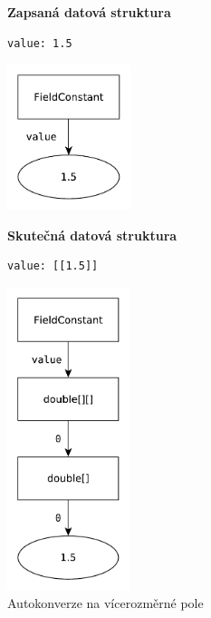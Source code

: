 \documentclass[FM,bw,DP]{tulthesis}
\begin{document}
\begin{figure}[ht]
\begin{minipage}[t]{0.45\linewidth}
\vspace{0pt}
\textbf{Zapsaná datová struktura}\\
\vspace{-5pt}
\begin{lstlisting}
value: 1.5
\end{lstlisting}
\vspace*{-20pt}
\begin{center}
\includegraphics[height=120pt]{../img/autoconversion_array_2_before.pdf}
\end{center}
\end{minipage}
\quad
\begin{minipage}[t]{0.45\linewidth}
\vspace{0pt}
\textbf{Skutečná datová struktura}\\
\vspace{-5pt}
\begin{lstlisting}
value: [[1.5]]
\end{lstlisting}
\vspace*{-20pt}
\begin{center}
\includegraphics[height=250pt]{../img/autoconversion_array_2_after.pdf}
\end{center}
\end{minipage}
\caption{Autokonverze na vícerozměrné pole}
\label{img:autoconversion_array_2}
\end{figure}	
\end{document}
